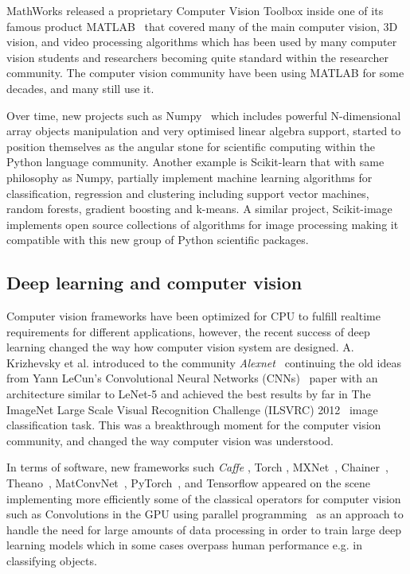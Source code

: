 MathWorks released a proprietary Computer Vision Toolbox inside one of its famous product MATLAB~\citep{MATLAB:2010} that covered many of the main computer vision, 3D vision, and video processing algorithms which has been used by many computer vision students and researchers becoming quite standard within the researcher community. The computer vision community have been using MATLAB for some decades, and many still use it.

Over time, new projects such as Numpy~\citep{oliphant2006guide} which includes powerful N-dimensional array objects manipulation and very optimised linear algebra support, started to position themselves as the angular stone for scientific computing within the Python language community. Another example is Scikit-learn \citep{scikit-learn} that with same philosophy as Numpy, partially implement machine learning algorithms  for classification, regression and clustering including support vector machines, random forests, gradient boosting and k-means. A similar project,  Scikit-image~\citep{scikit-image} implements open source collections of algorithms for image processing making it compatible with this new group of Python scientific packages.

\subsection{Deep learning and computer vision}
\label{section:related_work:deep_learning}
Computer vision frameworks have been optimized for CPU to fulfill realtime requirements for different applications, however, the recent success of deep learning changed the way how computer vision system are designed. A. Krizhevsky et al. introduced to the community \textit{Alexnet}~\citep{AlexNet2012} continuing the old ideas from Yann LeCun's Convolutional Neural Networks (CNNs)~\citep{MNIST1998} paper with an architecture similar to LeNet-5 and achieved the best results by far in The ImageNet Large Scale Visual Recognition Challenge (ILSVRC)  2012~\citep{ILSVRC15} image classification task. This was a breakthrough moment for the computer vision community, and changed the way computer vision was understood.

In terms of software, new frameworks such \textit{Caffe} \citep{caffe}, Torch \citep{torch7}, MXNet~\citep{journals/corr/ChenLLLWWXXZZ15}, Chainer~\citep{Tokui:2019:CDL:3292500.3330756}, Theano~\citep{Bergstra10theano}, MatConvNet~\citep{Vedaldi15}, PyTorch~\citep{pytorch}, and Tensorflow \citep{tensorflow2015-whitepaper} appeared on the scene implementing more efficiently some of the classical operators for computer vision such as Convolutions in the GPU using parallel programming~\citep{CookCUDA} as an approach to handle the need for large amounts of data processing in order to train large deep learning models which in some cases overpass human performance e.g. in classifying objects.

